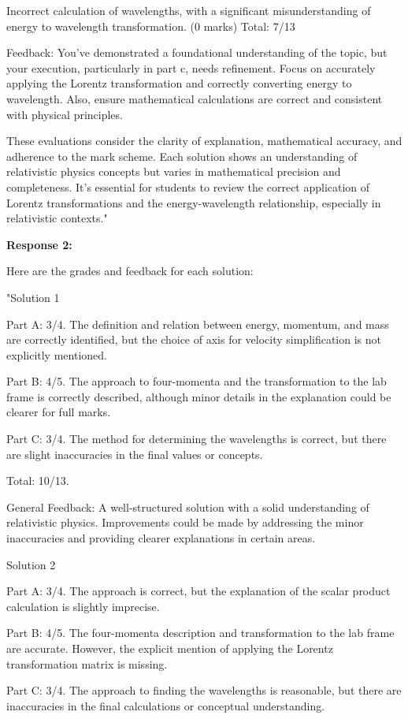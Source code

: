 \documentclass[a4paper,11pt]{article}
\begin{document}
Incorrect calculation of wavelengths, with a significant misunderstanding of energy to wavelength transformation. (0 marks)
Total: 7/13

Feedback: You've demonstrated a foundational understanding of the topic, but your execution, particularly in part c, needs refinement. Focus on accurately applying the Lorentz transformation and correctly converting energy to wavelength. Also, ensure mathematical calculations are correct and consistent with physical principles.

These evaluations consider the clarity of explanation, mathematical accuracy, and adherence to the mark scheme. Each solution shows an understanding of relativistic physics concepts but varies in mathematical precision and completeness. It's essential for students to review the correct application of Lorentz transformations and the energy-wavelength relationship, especially in relativistic contexts."

\textbf{Response 2:}

Here are the grades and feedback for each solution:

"Solution 1

Part A: 3/4. The definition and relation between energy, momentum, and mass are correctly identified, but the choice of axis for velocity simplification is not explicitly mentioned.

Part B: 4/5. The approach to four-momenta and the transformation to the lab frame is correctly described, although minor details in the explanation could be clearer for full marks.

Part C: 3/4. The method for determining the wavelengths is correct, but there are slight inaccuracies in the final values or concepts.

Total: 10/13.

General Feedback: A well-structured solution with a solid understanding of relativistic physics. Improvements could be made by addressing the minor inaccuracies and providing clearer explanations in certain areas.

Solution 2

Part A: 3/4. The approach is correct, but the explanation of the scalar product calculation is slightly imprecise.

Part B: 4/5. The four-momenta description and transformation to the lab frame are accurate. However, the explicit mention of applying the Lorentz transformation matrix is missing.

Part C: 3/4. The approach to finding the wavelengths is reasonable, but there are inaccuracies in the final calculations or conceptual understanding.
\end{document}
